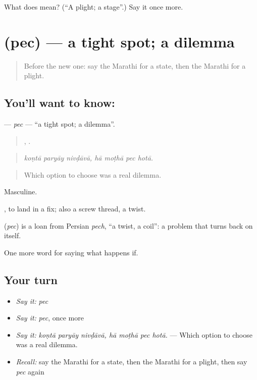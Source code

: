 \begin{tcolorbox}[breakable,colback=teal!4,colframe=teal!35!black,title={Before you move on}]
What does  mean? (\textquotedblleft{}A plight; a stage\textquotedblright{}.) Say it once more.
\end{tcolorbox}
\section[\texorpdfstring{\mr{पेच} (pec)}{पेच (pec)}]{ (pec) — a tight spot; a dilemma}

\label{lesson:MR-C384-pec}



\begin{quote}
Before the new one: say the Marathi for a state, then the Marathi for a plight.
\end{quote}

\subsection*{You'll want to know: }
\textbf{} — \emph{pec} — \textquotedblleft{}a tight spot; a dilemma\textquotedblright{}.

\begin{quote}
  ,    .
\end{quote}

\begin{quote}
\emph{koṇtā paryāy nivḍāvā, hā moṭhā pec hotā.}
\end{quote}

\begin{quote}
Which option to choose was a real dilemma.
\end{quote}

Masculine.

 , to land in a fix; also a screw thread, a twist.

\begin{cousinweb}
\textbf{} (\emph{pec}) is a loan from Persian \emph{pech}, \textquotedblleft{}a twist, a coil\textquotedblright{}: a problem that turns back on itself.
\end{cousinweb}

\begin{grammarlens}[title={What you've built}]
One more word for saying what happens if.
\end{grammarlens}

\subsection*{Your turn}
\begin{itemize}
\raggedright
  \item \emph{Say it:} \emph{pec}
  \item \emph{Say it:} \emph{pec}, once more
  \item \emph{Say it:} \emph{koṇtā paryāy nivḍāvā, hā moṭhā pec hotā.} — Which option to choose was a real dilemma.
  \item \emph{Recall:} say the Marathi for a state, then the Marathi for a plight, then say \emph{pec} again
\end{itemize}

